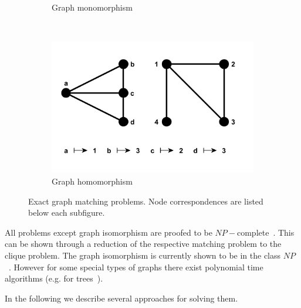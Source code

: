 \begin{figure}[h!]
\begin{subfigure}[b]{0.3\textwidth}
        \caption{Graph monomorphism}
        \label{fig:monomorphism}
    \end{subfigure}
    ~
    \begin{subfigure}[b]{0.3\textwidth}
        \includegraphics[width=\textwidth]{chapter1/fig/homomorphism}
        \caption{Graph homomorphism}
        \label{fig:homomorphism}
    \end{subfigure}
    \caption[Exact graph matching problems]{Exact graph matching problems. Node correspondences are listed below each subfigure.}\label{fig:Exact_GM}
\end{figure}

All problems except graph isomorphism are proofed to be $NP-$complete~\cite{Garey_NPComplet}. This can be shown through a reduction of the respective matching problem to the clique problem. The graph isomorphism is currently shown to be in the class $NP$~\cite{Garey_NPComplet,Schoening_GI}. However for some special types of graphs there exist polynomial time algorithms (e.g. for %
trees~\cite{Aho_Ullman, Garey_NPComplet}).

In the following we describe several approaches for solving them.

